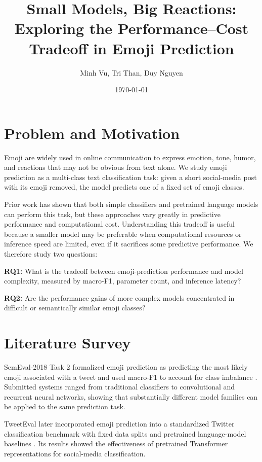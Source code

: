 \documentclass[12pt]{extarticle}
\title{Small Models, Big Reactions: Exploring the Performance–Cost Tradeoff in Emoji Prediction}
\author{Minh Vu, Tri Than, Duy Nguyen}
\date{\today}
\begin{document}
\maketitle


\section{Problem and Motivation}

Emoji are widely used in online communication to express emotion, tone, humor, 
and reactions that may not be obvious from text alone. We study emoji prediction 
as a multi-class text classification task: given a short social-media post with 
its emoji removed, the model predicts one of a fixed set of emoji classes.

Prior work has shown that both simple classifiers and pretrained language models
can perform this task, but these approaches vary greatly in predictive performance
and computational cost. Understanding this tradeoff is useful because a smaller
model may be preferable when computational resources or inference speed are limited,
even if it sacrifices some predictive performance. We therefore study two questions:

\textbf{RQ1:} What is the tradeoff between emoji-prediction performance and model
complexity, measured by macro-F1, parameter count, and inference latency?

\textbf{RQ2:} Are the performance gains of more complex models concentrated in
difficult or semantically similar emoji classes?

\section{Literature Survey}

SemEval-2018 Task 2 formalized emoji prediction as predicting the most likely
emoji associated with a tweet and used macro-F1 to account for class imbalance
\cite{barbieri2018semeval}. Submitted systems ranged from traditional classifiers
to convolutional and recurrent neural networks, showing that substantially different
model families can be applied to the same prediction task.

TweetEval later incorporated emoji prediction into a standardized Twitter
classification benchmark with fixed data splits and pretrained language-model
baselines \cite{barbieri2020tweeteval}. Its results showed the effectiveness of
pretrained Transformer representations for social-media classification.
\end{document}
